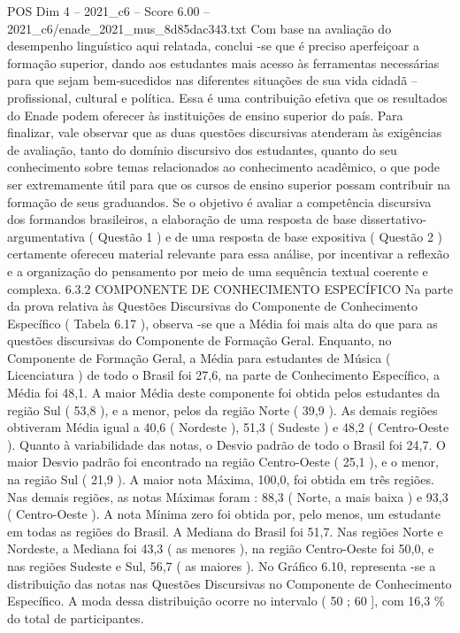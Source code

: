 \begin{textsample}{POS Dim 4 – 2021\_c6 – Score 6.00 – 2021\_c6/enade\_2021\_mus\_8d85dac343.txt}
Com base na avaliação do desempenho linguístico aqui relatada, conclui -se que é preciso aperfeiçoar a formação superior, dando aos estudantes mais acesso às ferramentas necessárias para que sejam bem-sucedidos nas diferentes situações de sua vida cidadã – profissional, cultural e política.
Essa é uma contribuição efetiva que os resultados do Enade podem oferecer às instituições de ensino superior do país.
Para finalizar, vale observar que as duas questões discursivas atenderam às exigências de avaliação, tanto do domínio discursivo dos estudantes, quanto do seu conhecimento sobre temas relacionados ao conhecimento acadêmico, o que pode ser extremamente útil para que os cursos de ensino superior possam contribuir na formação de seus graduandos.
Se o objetivo é avaliar a competência discursiva dos formandos brasileiros, a elaboração de uma resposta de base dissertativo-argumentativa ( Questão 1 ) e de uma resposta de base expositiva ( Questão 2 ) certamente ofereceu material relevante para essa análise, por incentivar a reflexão e a organização do pensamento por meio de uma sequência textual coerente e complexa. 6.3.2 COMPONENTE DE CONHECIMENTO ESPECÍFICO Na parte da prova relativa às Questões Discursivas do Componente de Conhecimento Específico ( Tabela 6.17 ), observa -se que a Média foi mais alta do que para as questões discursivas do Componente de Formação Geral.
Enquanto, no Componente de Formação Geral, a Média para estudantes de Música ( Licenciatura ) de todo o Brasil foi 27,6, na parte de Conhecimento Específico, a Média foi 48,1.
A maior Média deste componente foi obtida pelos estudantes da região Sul ( 53,8 ), e a menor, pelos da região Norte ( 39,9 ).
As demais regiões obtiveram Média igual a 40,6 ( Nordeste ), 51,3 ( Sudeste ) e 48,2 ( Centro-Oeste ).
Quanto à variabilidade das notas, o Desvio padrão de todo o Brasil foi 24,7.
O maior Desvio padrão foi encontrado na região Centro-Oeste ( 25,1 ), e o menor, na região Sul ( 21,9 ).
A maior nota Máxima, 100,0, foi obtida em três regiões.
Nas demais regiões, as notas Máximas foram : 88,3 ( Norte, a mais baixa ) e 93,3 ( Centro-Oeste ).
A nota Mínima zero foi obtida por, pelo menos, um estudante em todas as regiões do Brasil.
A Mediana do Brasil foi 51,7.
Nas regiões Norte e Nordeste, a Mediana foi 43,3 ( as menores ), na região Centro-Oeste foi 50,0, e nas regiões Sudeste e Sul, 56,7 ( as maiores ).
No Gráfico 6.10, representa -se a distribuição das notas nas Questões Discursivas no Componente de Conhecimento Específico.
A moda dessa distribuição ocorre no intervalo ( 50 ; 60 ], com 16,3 \% do total de participantes.

\end{textsample}
